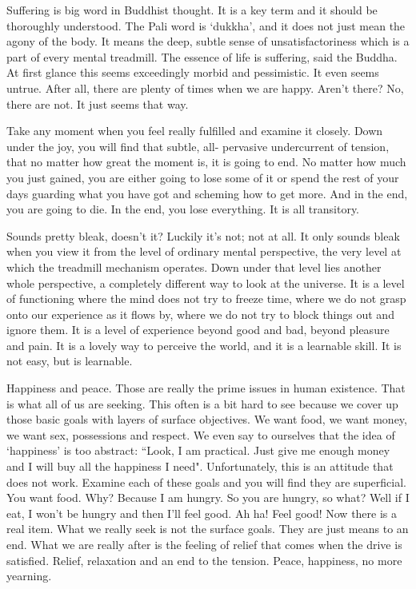 Suffering is big word in Buddhist thought. It is a key term and it should be
thoroughly understood. The Pali word is `dukkha', and it does not just mean the
agony of the body. It means the deep, subtle sense of unsatisfactoriness which
is a part of every mental treadmill. The essence of life is suffering, said the
Buddha. At first glance this seems exceedingly morbid and pessimistic.  It even
seems untrue. After all, there are plenty of times when we are happy. Aren't
there? No, there are not. It just seems that way.

Take any moment when you feel really fulfilled and examine it closely. Down
under the joy, you will find that subtle, all- pervasive undercurrent of
tension, that no matter how great the moment is, it is going to end. No matter
how much you just gained, you are either going to lose some of it or spend the
rest of your days guarding what you have got and scheming how to get more. And
in the end, you are going to die. In the end, you lose everything. It is all
transitory.

Sounds pretty bleak, doesn't it? Luckily it's not; not at all. It only sounds
bleak when you view it from the level of ordinary mental perspective, the very
level at which the treadmill mechanism operates. Down under that level lies
another whole perspective, a completely different way to look at the universe.
It is a level of functioning where the mind does not try to freeze time, where
we do not grasp onto our experience as it flows by, where we do not try to block
things out and ignore them. It is a level of experience beyond good and bad,
beyond pleasure and pain. It is a lovely way to perceive the world, and it is a
learnable skill. It is not easy, but is learnable.

Happiness and peace. Those are really the prime issues in human existence. That
is what all of us are seeking. This often is a bit hard to see because we cover
up those basic goals with layers of surface objectives. We want food, we want
money, we want sex, possessions and respect. We even say to ourselves that the
idea of `happiness' is too abstract: ``Look, I am practical. Just give me enough
money and I will buy all the happiness I need". Unfortunately, this is an
attitude that does not work. Examine each of these goals and you will find they
are superficial. You want food. Why? Because I am hungry. So you are hungry, so
what? Well if I eat, I won't be hungry and then I'll feel good. Ah ha! Feel
good! Now there is a real item. What we really seek is not the surface goals.
They are just means to an end. What we are really after is the feeling of relief
that comes when the drive is satisfied.  Relief, relaxation and an end to the
tension. Peace, happiness, no more yearning.

